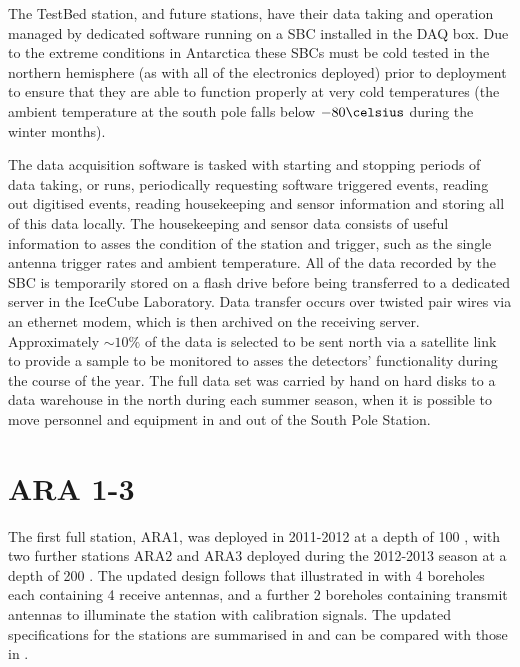 The TestBed station, and future stations, have their data taking and operation managed by dedicated software running on a SBC installed in the DAQ box. Due to the extreme conditions in Antarctica these SBCs must be cold tested in the northern hemisphere (as with all of the electronics deployed) prior to deployment to ensure that they are able to function properly at very cold temperatures (the ambient temperature at the south pole falls below $-80 \celsius $ during the winter months).

The data acquisition software is tasked with starting and stopping  periods of data taking, or runs, periodically requesting software triggered events, reading out digitised events, reading housekeeping and sensor information and storing all of this data locally. The housekeeping and sensor data consists of useful information to asses the condition of the station and trigger, such as the single antenna trigger rates and ambient temperature. All of the data recorded by the SBC is temporarily stored on a flash drive before being transferred to a dedicated server in the IceCube Laboratory. Data transfer occurs over twisted pair wires via an ethernet modem, which is then archived on the receiving server. Approximately $\sim 10 \%$ of the data is selected to be sent north via a satellite link to provide a sample to be monitored to asses the detectors' functionality during the course of the year. The full data set was carried by hand on hard disks to a data warehouse in the north during each summer season, when it is possible to move personnel and equipment in and out of the South Pole Station. 


\section{ARA 1-3}
\label{sec:ara-detector:ARA1-3}

The first full station, ARA1, was deployed in 2011-2012 at a depth of 100 \meter, with two further stations ARA2 and ARA3 deployed during the 2012-2013 season at a depth of 200 \meter. The updated design follows that illustrated in  with 4 boreholes each containing 4 receive antennas, and a further 2 boreholes containing transmit antennas to illuminate the station with calibration signals. The updated specifications for the stations are summarised in  and can be compared with those in .

